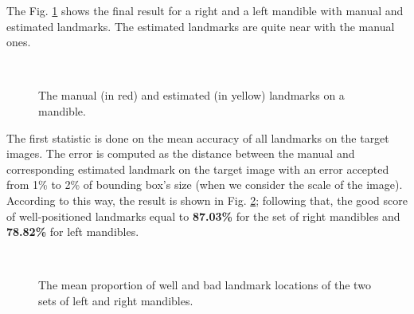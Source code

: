 \documentclass{gretsi}
\begin{document}
The Fig. \ref{fig5} shows the final result for a right and a left mandible with manual and estimated landmarks. The estimated landmarks are quite near with the manual ones.  

\begin{figure}[h]

\centering
{}~~
\caption{The manual (in red) and estimated (in yellow) landmarks on a mandible.}
\label{fig5}
\end{figure}

The first statistic is done on the mean accuracy of all landmarks on the target images. The error is computed as the distance between the manual and corresponding estimated landmark on the target image with an error accepted from 1\% to 2\% of bounding box's size (when we consider the scale of the image). According to this way, the result is shown in Fig. \ref{fig6}; following that, the good score of well-positioned landmarks equal to \textbf{87.03\%} for the set of right mandibles and \textbf{78.82\%} for left mandibles.
\begin{figure}[h]
\centering
{}~~
\caption{The mean proportion of well and bad landmark locations of the two sets of left and right mandibles.}
\label{fig6}
\end{figure}
\end{document}
